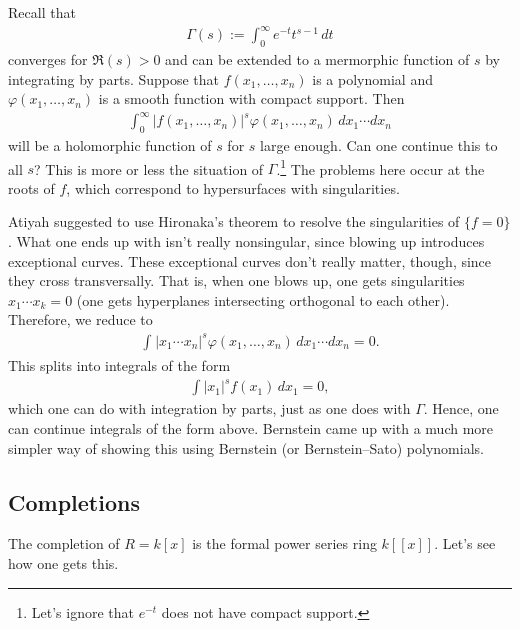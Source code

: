 \documentclass[11pt, oneside,margin=1in]{article}
\begin{document}
\begin{example}\label{}\text{}
Recall that
\begin{align*}
	\Gamma(s) :=  \int_{0}^{\infty} e^{-t}t^{s-1}  \, dt
\end{align*}
	converges for $\Re (s)>0$ and can be extended to a mermorphic function of $s$ by integrating by parts. Suppose that $f(x_1,\hdots,x_n)$ is a polynomial and $\varphi(x_1,\hdots, x_n)$ is a smooth function with compact support. Then
	\begin{align*}
		\int_{0}^{\infty} \left\lvert f(x_1,\hdots, x_n) \right\rvert ^s\varphi(x_1,\hdots,x_n)  \, dx_1\cdots dx_n 
	\end{align*}
	will be a holomorphic function of $s$ for $s$ large enough. Can one continue this to all $s$? This is more or less the situation of $\Gamma$.\footnote{Let's ignore that $e^{-t}$ does not have compact support.} The problems here occur at the roots of $f$, which correspond to hypersurfaces with singularities.
	
	Atiyah suggested to use Hironaka's theorem to resolve the singularities of $\{f=0\}$. What one ends up with isn't really nonsingular, since blowing up introduces exceptional curves. These exceptional curves don't really matter, though, since they cross transversally. That is, when one blows up, one gets singularities $x_1\cdots x_k=0$ (one gets hyperplanes intersecting orthogonal to each other). Therefore, we reduce to 
	\begin{align*}
		\int_{}^{}  \left\lvert x_1\cdots x_n \right\rvert^s\varphi(x_1,\hdots,x_n)   \, dx_1\cdots dx_n =0.
	\end{align*}
	This splits into integrals of the form
	\begin{align*}
		\int\left\lvert x_1 \right\rvert ^sf(x_1)\, dx_1=0,
	\end{align*}
	which one can do with integration by parts, just as one does with $\Gamma$. Hence, one can continue integrals of the form above. Bernstein came up with a much more simpler way of showing this using Bernstein (or Bernstein--Sato) polynomials.
\end{example}

\subsection{Completions}
The completion of $R=k[x]$ is the formal power series ring $k[\![x]\!]$. Let's see how one gets this.
\end{document}
